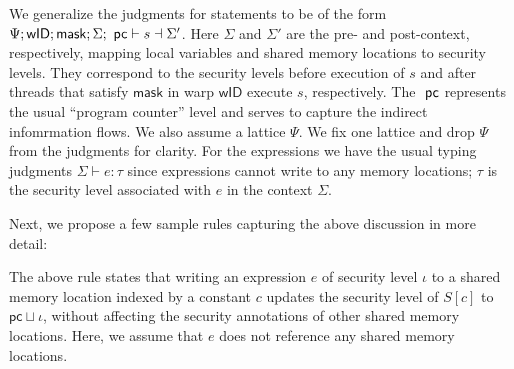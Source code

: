We generalize the judgments for statements to be of the form
%
$\Psi; \mathsf{wID};\mathsf{mask};  \Sigma; \pc\vdash s \dashv \Sigma'$.
%
Here $\Sigma$ and $\Sigma'$ are the pre- and post-context, respectively, mapping local variables and shared memory locations to security levels.
%
They correspond to the  security levels before  execution of $s$ and after threads that satisfy $\mathsf{mask}$ in warp $\mathsf{wID}$ execute $s$, respectively.
%
%
%
The $\pc$ represents the usual ``program counter'' level and serves to capture the indirect infomrmation flows.
% 
We also assume a lattice $\Psi$.
%
We fix one lattice and drop $\Psi$ from the judgments for clarity.
%
%
For the expressions we have the usual typing judgments $\Sigma \vdash e: \tau$ since expressions cannot write to any memory locations; $\tau$ is the security level associated with $e$ in the context $\Sigma$.

%
%

%
Next, we propose a few sample rules capturing the above discussion in more detail:
%
\begin{mathpar}
    \end{mathpar}
The above rule states that writing an expression $e$ of security level $\iota$ to a shared memory location indexed by a constant $c$ updates the security level of $S[c]$ to $\mathsf{pc} \sqcup \iota$, without affecting the security annotations of other shared memory locations.
% 
Here, we assume that $e$ does not reference any shared memory locations.

